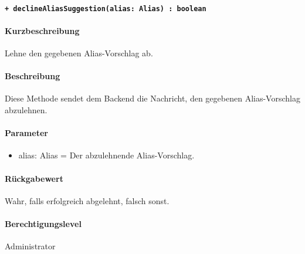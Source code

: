 \paragraph{\texttt{+ declineAliasSuggestion(alias: Alias) : boolean}}\label{AP_Framework_declineAliasSuggestion}%
\paragraph*{Kurzbeschreibung}
Lehne den gegebenen Alias-Vorschlag ab.
\paragraph*{Beschreibung}
Diese Methode sendet dem Backend die Nachricht, den gegebenen Alias-Vorschlag abzulehnen.
\paragraph*{Parameter}
\begin{itemize}
    \item alias: Alias = Der abzulehnende Alias-Vorschlag.
\end{itemize}
\paragraph*{Rückgabewert}
Wahr, falls erfolgreich abgelehnt, falsch sonst.
\paragraph*{Berechtigungslevel}
Administrator